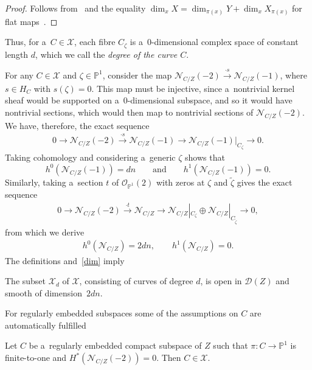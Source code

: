 \begin{proof}
Follows from~\cite[Corollary 18.17]{Eis1} and the equality $\dim_xX=\dim_{\pi(x)}Y+\dim_{x} X_{\pi(x)}$ for f\/lat
maps~\cite[Proposition II.2.11]{GR}.
\end{proof}

Thus, for a~$C\in {\mathcal{X}}$, each f\/ibre $C_\zeta$ is a~$0$-dimensional complex space of constant length $d$, which
we call the {\em degree of the curve $C$}.

For any $C\in {\mathcal{X}}$ and $\zeta\in {\mathbb{P}}^1$, consider the map ${\mathcal{N}}_{C/Z}(-2)\stackrel{\cdot
s}{\longrightarrow} {\mathcal{N}}_{C/Z}(-1)$, where $s\in H_C$ with $s(\zeta)=0$.
This map must be injective, since a~nontrivial kernel sheaf would be supported on a~$0$-dimensional subspace, and so it
would have nontrivial sections, which would then map to nontrivial sections of ${\mathcal{N}}_{C/Z}(-2)$.
We have, therefore, the exact sequence
\begin{gather}
0\to {\mathcal{N}}_{C/Z}(-2)\stackrel{\cdot s}{\longrightarrow} {\mathcal{N}}_{C/Z}(-1)\longrightarrow
{\mathcal{N}}_{C/Z}(-1)|_{C_\zeta}\to 0.
\label{seq}
\end{gather}
Taking cohomology and considering a~generic $\zeta$ shows that
\[
h^0( {\mathcal{N}}_{C/Z}(-1))=dn \qquad \text{and}\qquad h^1(
{\mathcal{N}}_{C/Z}(-1))=0.
\]
Similarly, taking a~section $t$ of ${\mathcal{O}}_{{\mathbb{P}}^1}(2)$ with zeros at $\zeta$ and $\tilde\zeta$ gives the
exact sequence
\begin{gather}
0\to {\mathcal{N}}_{C/Z}(-2)\stackrel{\cdot t}{\longrightarrow} {\mathcal{N}}_{C/Z}\longrightarrow
{\mathcal{N}}_{C/Z}|_{C_\zeta}\oplus {\mathcal{N}}_{C/Z}|_{C_{\tilde\zeta}}\to 0,
\label{seqq}
\end{gather}
from which we derive
\begin{gather}
h^0( {\mathcal{N}}_{C/Z})=2dn,
\qquad
h^1( {\mathcal{N}}_{C/Z})=0.
\label{dim}
\end{gather}
The def\/initions and~\eqref{dim} imply
\begin{Proposition}
The subset ${\mathcal{X}}_d$ of ${\mathcal{X}}$, consisting of curves of degree $d$, is open in ${\mathcal{D}}(Z)$ and
smooth of dimension~$2dn$.
\end{Proposition}

For regularly embedded subspaces some of the assumptions on $C$ are automatically fulf\/illed

\begin{Lemma}\label{ooo}
Let $C$ be a~regularly embedded compact subspace of $Z$ such that $\pi:C\to {\mathbb{P}}^1$ is finite-to-one and
$H^\ast({\mathcal{N}}_{C/Z}(-2))=0$.
Then $C\in {\mathcal{X}}$.
\end{Lemma}

